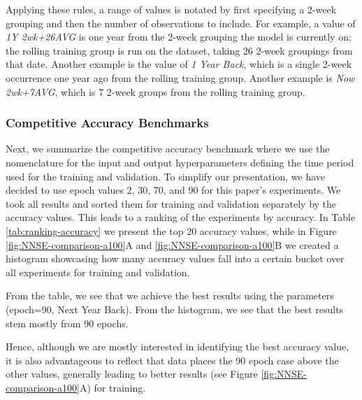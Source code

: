 \documentclass[utf8]{FrontiersinVancouver} %
\begin{document}
Applying these rules, a range of values is notated by first specifying a 2-week grouping and then the number of observations to include. For example, a value of {\em 1Y 2wk+26AVG} is one year from the 2-week grouping the model is currently on; the rolling training group is run on the dataset, taking 26 2-week groupings from that date. Another example is the value of {\em 1 Year Back}, which is a single 2-week occurrence one year ago from the rolling training group. Another example is {\em Now 2wk+7AVG}, which is 7 2-week groups from the rolling training group.


\subsubsection{Competitive Accuracy Benchmarks}

Next, we summarize the competitive accuracy benchmark where we use the nomenclature for the input and output hyperparameters defining the time period used for the training and validation.  To simplify our presentation, we have decided to use epoch values 2, 30, 70, and 90 for this paper's experiments. We took all results and sorted them for training and validation separately by the accuracy values. This leads to a ranking of the experiments by accuracy. In Table \ref{tab:ranking-accuracy} we present the top 20 accuracy values, while in Figure \ref{fig:NNSE-comparison-a100}A and \ref{fig:NNSE-comparison-a100}B we created a histogram showcasing how many accuracy values fall into a certain bucket over all experiments for training and validation.

From the table, we see that we achieve the best results using the parameters (epoch=90, Next Year Back). From the histogram, we see that the best results stem mostly from 90 epochs.

Hence, although we are mostly interested in identifying the best accuracy value, it is also advantageous to reflect that data places the 90 epoch case above the other values, generally leading to better results (see Figure \ref{fig:NNSE-comparison-a100}A) for training.
\end{document}
